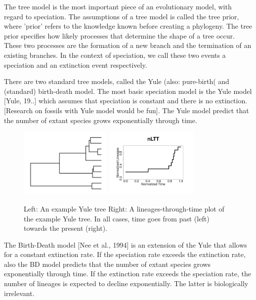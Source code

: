 The tree model is the most important piece of an evolutionary model,
with regard to speciation. The assumptions of a tree model is 
called the tree prior, where 'prior' refers to the knowledge
known before creating a phylogeny. The tree prior specifies how likely
processes that determine the shape of a tree occur. These
two processes are the formation of a new branch and the termination of
an existing branches. In the context of speciation, we call these
two events a speciation and an extinction event respectively.

There are two standard tree models, called the Yule (also: pure-birth(
and (standard) birth-death model. The most basic speciation model
is the Yule model [Yule, 19..] which assumes that speciation
is constant and there is no extinction.
[Research on fossils with Yule model would be fun].
The Yule model predict that the number of extant species
grows exponentially through time.

\begin{figure}[H]
  \includegraphics[width=0.4\textwidth]{yule_tree.png}
  \includegraphics[width=0.4\textwidth]{yule_tree_nltt.png}
  \caption{
    Left: An example Yule tree
    Right: A lineages-through-time plot of the example Yule tree.
    In all cases, time goes from past (left) towards the present (right).
  }
  \label{fig:yule}
\end{figure}

The Birth-Death model [Nee et al., 1994] is an extension of the
Yule that allows for a constant extinction rate. 
If the speciation rate exceeds the extinction rate,
also the BD model predicts that the number of extant species
grows exponentially through time. If the extinction rate exceeds
the speciation rate, the number of lineages is expected to decline
exponentially. The latter is biologically irrelevant.

